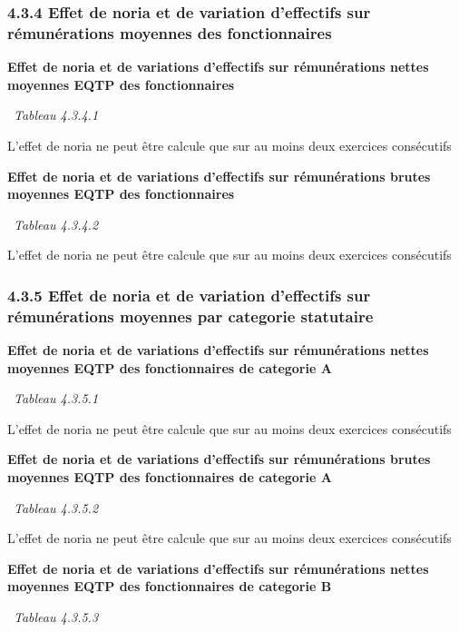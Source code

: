 \hypertarget{effet-de-noria-et-de-variation-deffectifs-sur-remunerations-moyennes-des-fonctionnaires}{%
\subsubsection{4.3.4 Effet de noria et de variation d'effectifs sur
rémunérations moyennes des
fonctionnaires}\label{effet-de-noria-et-de-variation-deffectifs-sur-remunerations-moyennes-des-fonctionnaires}}

\textbf{Effet de noria et de variations d'effectifs sur rémunérations
nettes moyennes EQTP des fonctionnaires}

~\emph{Tableau 4.3.4.1}

L'effet de noria ne peut être calcule que sur au moins deux exercices
consécutifs

\textbf{Effet de noria et de variations d'effectifs sur rémunérations
brutes moyennes EQTP des fonctionnaires}

~\emph{Tableau 4.3.4.2}

L'effet de noria ne peut être calcule que sur au moins deux exercices
consécutifs

\hypertarget{effet-de-noria-et-de-variation-deffectifs-sur-remunerations-moyennes-par-categorie-statutaire}{%
\subsubsection{4.3.5 Effet de noria et de variation d'effectifs sur
rémunérations moyennes par categorie
statutaire}\label{effet-de-noria-et-de-variation-deffectifs-sur-remunerations-moyennes-par-categorie-statutaire}}

\textbf{Effet de noria et de variations d'effectifs sur rémunérations
nettes moyennes EQTP des fonctionnaires de categorie A}

~\emph{Tableau 4.3.5.1}

L'effet de noria ne peut être calcule que sur au moins deux exercices
consécutifs

\textbf{Effet de noria et de variations d'effectifs sur rémunérations
brutes moyennes EQTP des fonctionnaires de categorie A}

~\emph{Tableau 4.3.5.2}

L'effet de noria ne peut être calcule que sur au moins deux exercices
consécutifs

\textbf{Effet de noria et de variations d'effectifs sur rémunérations
nettes moyennes EQTP des fonctionnaires de categorie B}

~\emph{Tableau 4.3.5.3}

